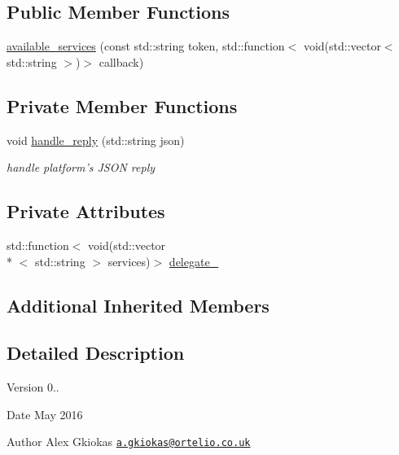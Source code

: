 \subsection*{Public Member Functions}
\begin{DoxyCompactItemize}
\item 
\hyperlink{classrapp_1_1cloud_1_1login__user_ace2a78da76bd98970cfd3c01a3053c71}{available\-\_\-services} (const std\-::string token, std\-::function$<$ void(std\-::vector$<$ std\-::string $>$)$>$ callback)
\end{DoxyCompactItemize}
\subsection*{Private Member Functions}
\begin{DoxyCompactItemize}
\item 
void \hyperlink{classrapp_1_1cloud_1_1login__user_a749edf3a4dc2168947ea8b78c952fe75}{handle\-\_\-reply} (std\-::string json)
\begin{DoxyCompactList}\small\item\em handle platform's J\-S\-O\-N reply \end{DoxyCompactList}\end{DoxyCompactItemize}
\subsection*{Private Attributes}
\begin{DoxyCompactItemize}
\item 
std\-::function$<$ void(std\-::vector\\*
$<$ std\-::string $>$ services)$>$ \hyperlink{classrapp_1_1cloud_1_1login__user_ab36ba8bfaf26a1960ab874ce38cc94b0}{delegate\-\_\-}
\end{DoxyCompactItemize}
\subsection*{Additional Inherited Members}


\subsection{Detailed Description}
\begin{DoxyVersion}{Version}
0.. 
\end{DoxyVersion}
\begin{DoxyDate}{Date}
May 2016 
\end{DoxyDate}
\begin{DoxyAuthor}{Author}
Alex Gkiokas \href{mailto:a.gkiokas@ortelio.co.uk}{\tt a.\-gkiokas@ortelio.\-co.\-uk} 
\end{DoxyAuthor}


